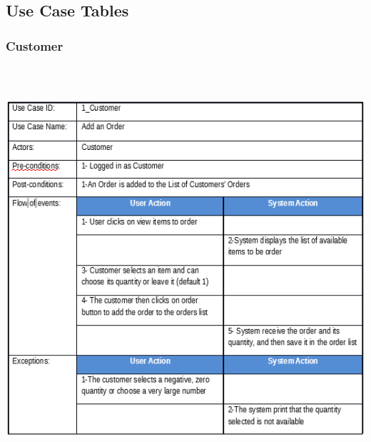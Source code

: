 \documentclass[12pt]{article}
\begin{document}
\subsection{ Use Case Tables }

\subsubsection{ Customer }
\begin{center}
	\includegraphics[width=17cm,height=15cm]{./assets/usecasetable/customer-1.png}\\

\end{center}
\end{document}
